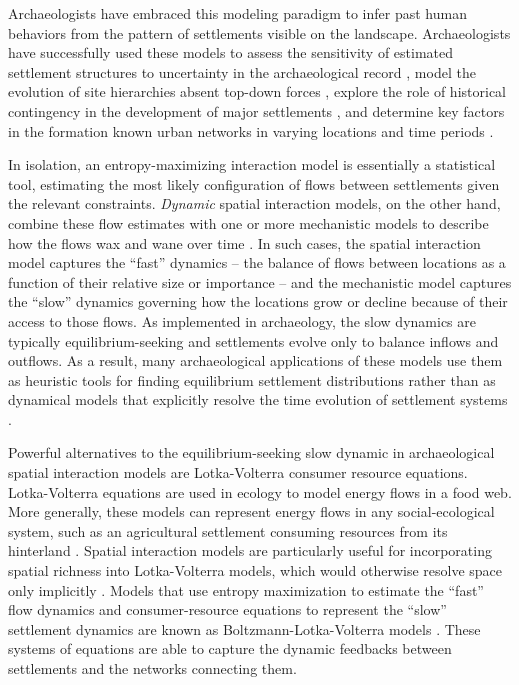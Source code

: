 \documentclass{article}
\begin{document}
Archaeologists have embraced this modeling paradigm to infer past human behaviors from the pattern of settlements visible on the landscape. Archaeologists have successfully used these models to assess the sensitivity of estimated settlement structures to uncertainty in the archaeological record \parencite{Bevan2013, Paliou2016}, model the evolution of site hierarchies absent top-down forces \parencite{Altaweel2015}, explore the role of historical contingency in the development of major settlements \parencite{Evans2017WasNecessary}, and determine key factors in the formation known urban networks in varying locations and time periods \parencite{Davies2014, Altaweel2015a, Palmisano2015, Filet2017}.

In isolation, an entropy-maximizing interaction model is essentially a statistical tool, estimating the most likely configuration of flows between settlements given the relevant constraints. \emph{Dynamic} spatial interaction models, on the other hand, combine these flow estimates with one or more mechanistic models to describe how the flows wax and wane over time \parencite{Harris1978}. In such cases, the spatial interaction model captures the ``fast'' dynamics -- the balance of flows between locations as a function of their relative size or importance -- and the mechanistic model captures the ``slow'' dynamics governing how the locations grow or decline because of their access to those flows. As implemented in archaeology, the slow dynamics are typically equilibrium-seeking and settlements evolve only to balance inflows and outflows. As a result, many archaeological applications of these models use them as heuristic tools for finding equilibrium settlement distributions rather than as dynamical models that explicitly resolve the time evolution of settlement systems \parencite{Bevan2013}. 

Powerful alternatives to the equilibrium-seeking slow dynamic in archaeological spatial interaction models are Lotka-Volterra consumer resource equations. Lotka-Volterra equations are used in ecology to model energy flows in a food web. More generally, these models can represent energy flows in any social-ecological system, such as an agricultural settlement consuming resources from its hinterland \parencite{Anderies2011a, Qubbaj2014}. Spatial interaction models are particularly useful for incorporating spatial richness into Lotka-Volterra models, which would otherwise resolve space only implicitly \parencite{Wilson2006}. Models that use entropy maximization to estimate the ``fast'' flow dynamics and consumer-resource equations to represent the ``slow'' settlement dynamics are known as Boltzmann-Lotka-Volterra models \parencite{Wilson2008}. These systems of equations are able to capture the dynamic feedbacks between settlements and the networks connecting them. 
\end{document}
